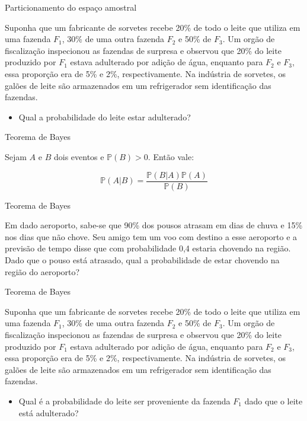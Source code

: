 \begin{frame}{Particionamento do espaço amostral}
\begin{exemplo}[2]
    Suponha que um fabricante de sorvetes recebe 20\% de todo o leite que utiliza em uma fazenda $F_1$, 30\% de uma outra fazenda $F_2$ e 50\% de $F_3$. Um orgão de fiscalização inspecionou as fazendas de surpresa e observou que 20\% do leite produzido por $F_1$ estava adulterado por adição de água, enquanto para $F_2$ e $F_3$, essa proporção era de 5\% e 2\%, respectivamente. Na indústria de sorvetes, os galões de leite são armazenados em um refrigerador sem identificação das fazendas. 

    \begin{itemize}
        \item Qual a probabilidade do leite estar adulterado?
    \end{itemize}
\end{exemplo}
\end{frame}

\begin{frame}{Teorema de Bayes}

    Sejam $A$ e $B$ dois eventos e $\mathds{P}(B)>0$. Então vale:
    
$$\mathds{P}(A|B) = \dfrac{\mathds{P}(B | A)\mathds{P}(A)}{\mathds{P}(B)}$$
    
\end{frame}

\begin{frame}{Teorema de Bayes}
        \begin{exemplo}[3]
        Em dado aeroporto, sabe-se que 90\% dos pousos atrasam em dias de chuva e 15\% nos dias que não chove. Seu amigo tem um voo com destino a esse aeroporto e a previsão de tempo disse que com probabilidade 0,4 estaria chovendo na região. Dado que o pouso está atrasado, qual a probabilidade de estar chovendo na região do aeroporto?
    \end{exemplo}
\end{frame}
\begin{frame}{Teorema de Bayes}
    \begin{exemplo}[4]
        Suponha que um fabricante de sorvetes recebe 20\% de todo o leite que utiliza em uma fazenda $F_1$, 30\% de uma outra fazenda $F_2$ e 50\% de $F_3$. Um orgão de fiscalização inspecionou as fazendas de surpresa e observou que 20\% do leite produzido por $F_1$ estava adulterado por adição de água, enquanto para $F_2$ e $F_3$, essa proporção era de 5\% e 2\%, respectivamente. Na indústria de sorvetes, os galões de leite são armazenados em um refrigerador sem identificação das fazendas. 

        \begin{itemize}
            \item Qual é a probabilidade do leite ser proveniente da fazenda $F_1$ dado que o leite está adulterado?
        \end{itemize}
    \end{exemplo}

    
\end{frame}

